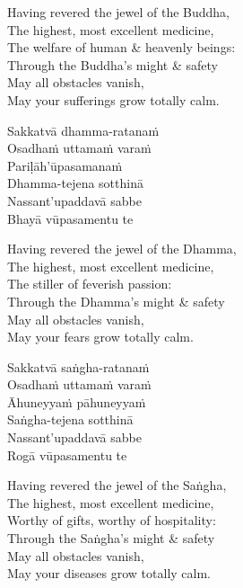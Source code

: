 \begin{english-verses}
  Having revered the jewel of the Buddha,\\
  The highest, most excellent medicine,\\
  The welfare of human \& heavenly beings:\\
  Through the Buddha's might \& safety\\
  May all obstacles vanish,\\
  May your sufferings grow totally calm.
\end{english-verses}

\begin{pali-hang-continued}
  Sakkatvā dhamma-ratanaṁ\\
  Osadhaṁ uttamaṁ varaṁ\\
  Pariḷāh'ūpasamanaṁ\\
  Dhamma-tejena sotthinā\\
  Nassant'upaddavā sabbe\\
  Bhayā vūpasamentu te
\end{pali-hang-continued}

\begin{english-verses}
  Having revered the jewel of the Dhamma,\\
  The highest, most excellent medicine,\\
  The stiller of feverish passion:\\
  Through the Dhamma's might \& safety\\
  May all obstacles vanish,\\
  May your fears grow totally calm.
\end{english-verses}

\begin{pali-hang-continued}
  Sakkatvā saṅgha-ratanaṁ\\
  Osadhaṁ uttamaṁ varaṁ\\
  Āhuneyyaṁ pāhuneyyaṁ\\
  Saṅgha-tejena sotthinā\\
  Nassant'upaddavā sabbe\\
  Rogā vūpasamentu te
\end{pali-hang-continued}

\begin{english-verses}
  Having revered the jewel of the Saṅgha,\\
  The highest, most excellent medicine,\\
  Worthy of gifts, worthy of hospitality:\\
  Through the Saṅgha's might \& safety\\
  May all obstacles vanish,\\
  May your diseases grow totally calm.
\end{english-verses}

